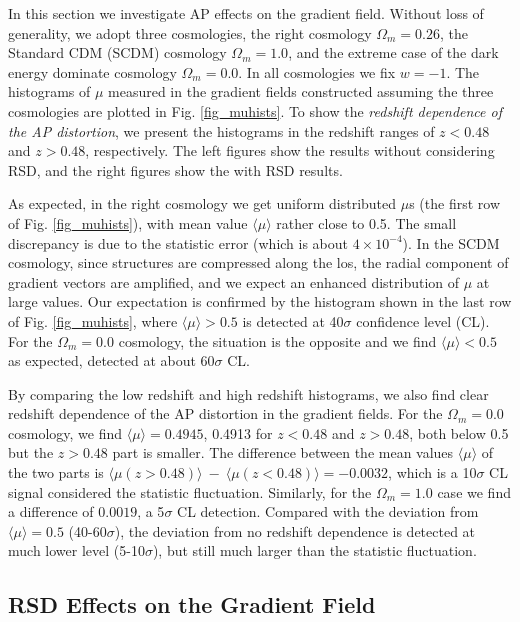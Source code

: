 \documentclass{emulateapj}
\begin{document}
In this section we investigate AP effects on the gradient field.
Without loss of generality, we adopt three cosmologies, 
the right cosmology $\Omega_m=0.26$, the Standard CDM (SCDM) cosmology $\Omega_m=1.0$,
and the extreme case of the dark energy dominate cosmology $\Omega_m=0.0$.
In all cosmologies we fix $w=-1$.
The histograms of $\mu$ measured in the gradient fields constructed assuming the three cosmologies are plotted in Fig. \ref{fig_muhists}.
To show the {\it redshift dependence of the AP distortion}, 
we present the histograms in the redshift ranges of $z<0.48$ and $z>0.48$, respectively.
The left figures show the results without considering RSD, 
and the right figures show the with RSD results.

As expected, in the right cosmology we get uniform distributed $\mu$s (the first row of Fig. \ref{fig_muhists}),
with mean value $\langle\mu\rangle$ rather close to 0.5.
The small discrepancy is due to the statistic error (which is about $4\times10^{-4}$).
In the SCDM cosmology, since structures are compressed along the los,
the radial component of gradient vectors are amplified, 
and we expect an enhanced distribution of $\mu$ at large values.
Our expectation is confirmed by the histogram shown in the last row of Fig. \ref{fig_muhists},
where $\langle\mu\rangle>0.5$ is detected at 40$\sigma$ confidence level (CL).
For the $\Omega_m=0.0$ cosmology, the situation is the opposite and we find $\langle\mu\rangle<0.5$ as expected, 
detected at about 60$\sigma$ CL.

By comparing the low redshift and high redshift histograms,
we also find clear redshift dependence of the AP distortion in the gradient fields.
For the $\Omega_m=0.0$ cosmology, 
we find $\langle\mu\rangle=0.4945$, 0.4913 for $z<0.48$ and $z>0.48$,
both below 0.5 but the $z>0.48$ part is smaller.
The difference between the mean values $\langle\mu\rangle$ of the two parts is
 $\langle\mu(z>0.48)\rangle\ -\ \langle\mu(z<0.48)\rangle= -0.0032$, 
which is a 10$\sigma$ CL signal considered the statistic fluctuation.
Similarly, for the $\Omega_m=1.0$ case we find a difference of $0.0019$, a 5$\sigma$ CL detection.
Compared with the deviation from $\langle\mu\rangle=0.5$ (40-60$\sigma$),
the deviation from no redshift dependence is detected at much lower level (5-10$\sigma$),
but still much larger than the statistic fluctuation.

\subsection{RSD Effects on the Gradient Field}
\end{document}
